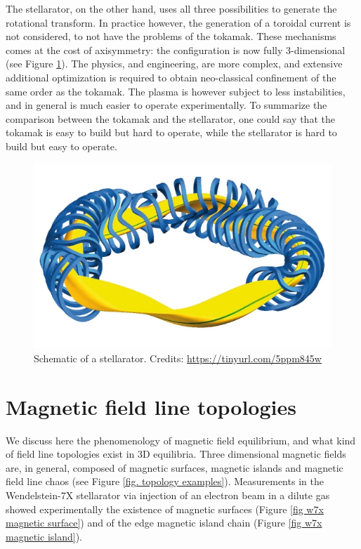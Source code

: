 \documentclass[my_thesis.tex]{subfiles}
\begin{document}
The stellarator, on the other hand, uses all three possibilities to generate the rotational transform. In practice however, the generation of a toroidal current is not considered, to not have the problems of the tokamak. These mechanisms comes at the cost of axisymmetry: the configuration is now fully 3-dimensional (see Figure \ref{fig stellarator sketch}). The physics, and engineering, are more complex, and extensive additional optimization is required to obtain neo-classical confinement of the same order as the tokamak. The plasma is however subject to less instabilities, and in general is much easier to operate experimentally. To summarize the comparison between the tokamak and the stellarator, one could say that the tokamak is easy to build but hard to operate, while the stellarator is hard to build but easy to operate.

\begin{figure}
    \centering
    \includegraphics[width=\linewidth]{images/Introduction/StellaratorSketch.jpg}
    \caption{Schematic of a stellarator. Credits: \url{https://tinyurl.com/5ppm845w}}
    \label{fig stellarator sketch}
\end{figure}




\section{Magnetic field line topologies}

We discuss here the phenomenology of magnetic field equilibrium, and what kind of field line topologies exist in 3D equilibria. Three dimensional magnetic fields are, in general, composed of  magnetic surfaces, magnetic islands and magnetic field line chaos (see Figure \ref{fig. topology examples}). Measurements in the Wendelstein-7X stellarator via injection of an electron beam in a dilute gas \citep{pedersenConfirmationTopologyWendelstein2016} showed experimentally the existence of magnetic surfaces (Figure \ref{fig w7x magnetic surface}) and of the edge magnetic island chain (Figure \ref{fig w7x magnetic island}).
\end{document}

